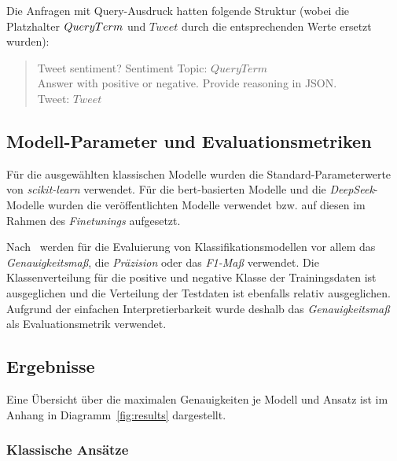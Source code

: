 Die Anfragen mit Query-Ausdruck hatten folgende Struktur (wobei die Platzhalter $Query\-Term$ und $Tweet$ durch die entsprechenden Werte ersetzt wurden):
\begin{quote}
    Tweet sentiment? Sentiment Topic: $QueryTerm$\\
    Answer with positive or negative. Provide reasoning in JSON.\\
    Tweet: $Tweet$
\end{quote}

\subsection{Modell-Parameter und Evaluationsmetriken}\label{subsec:modell-parameter-und-evaluationsmetriken}

Für die ausgewählten klassischen Modelle wurden die Standard-Parameterwerte von \textit{scikit-learn} verwendet.
Für die \gls{bert}-basierten Modelle und die \textit{DeepSeek}-Modelle wurden die veröffentlichten Modelle verwendet bzw. auf diesen im Rahmen des \textit{Finetunings} aufgesetzt.

Nach~\cite{wankhade2022survey} werden für die Evaluierung von Klassifikationsmodellen vor allem das \textit{Genauig\-keits\-maß}, die \textit{Präzision} oder das \textit{F1-Maß} verwendet.
Die Klassenverteilung für die positive und negative Klasse der Trainingsdaten ist ausgeglichen und die Verteilung der Testdaten ist ebenfalls relativ ausgeglichen.
Aufgrund der einfachen Interpretierbarkeit wurde deshalb das \textit{Genauigkeitsmaß} als Evaluationsmetrik verwendet.

\subsection{Ergebnisse}

Eine Übersicht über die maximalen Genauigkeiten je Modell und Ansatz ist im Anhang in Diagramm~\ref{fig:results} dargestellt.

\subsubsection{Klassische Ansätze}\label{subsubsec:ergebnisse-klassische-ansaetze}

